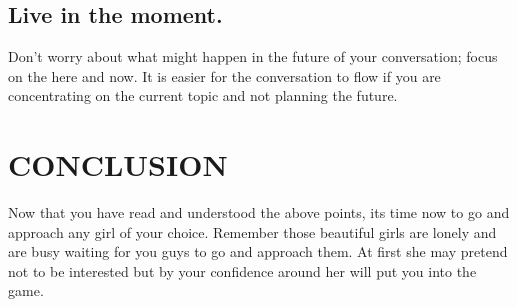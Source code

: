 \documentclass[12pt]{article}
\begin{document}
\subsection{Live in the moment.}
 Don't worry about what might happen in the future of your conversation; focus on the here and now. It is easier for the conversation to flow if you are concentrating on the current topic and not planning the future.
 \section{CONCLUSION}
 Now that you have read and understood the above points, its time now to go and approach any girl of your choice. Remember those beautiful girls are lonely and are busy waiting for you guys to go and approach them. At first she may pretend not to be interested but by your confidence around her will put you into the game.
\end{document}
